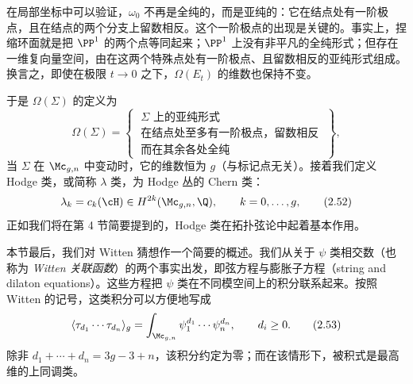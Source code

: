 
在局部坐标中可以验证，$\omega_0$ 不再是全纯的，而是亚纯的：它在结点处有一阶极点，且在结点的两个分支上留数相反。这个一阶极点的出现是关键的。事实上，捏缩环面就是把 $\PP^1$ 的两个点等同起来；$\PP^1$ 上没有非平凡的全纯形式；但存在一维复向量空间，由在这两个特殊点处有一阶极点、且留数相反的亚纯形式组成。换言之，即使在极限 $t\to 0$ 之下，$\Omega(E_t)$ 的维数也保持不变。

于是 $\Omega(\Sigma)$ 的定义为
\begin{equation}
  \Omega(\Sigma)=\left\{\;
  \begin{array}{c}
    \mbox{$\Sigma$ 上的亚纯形式}\\
    \mbox{在结点处至多有一阶极点，留数相反}\\
    \mbox{而在其余各处全纯}
  \end{array}
  \;\right\},
  \tag{2.51}
\end{equation}
当 $\Sigma$ 在 $\Mc_{g,n}$ 中变动时，它的维数恒为 $g$（与标记点无关）。接着我们定义 Hodge 类，或简称 $\lambda$ 类，为 Hodge 丛的 Chern 类：
\begin{equation}
  \lambda_k=c_k(\cH)\in H^{2k}(\Mc_{g,n},\Q),\qquad k=0,\dots,g,
  \tag{2.52}
\end{equation}
正如我们将在第 4 节简要提到的，Hodge 类在拓扑弦论中起着基本作用。

本节最后，我们对 Witten 猜想作一个简要的概述。我们从关于 $\psi$ 类相交数（也称为 \emph{Witten 关联函数}）的两个事实出发，即弦方程与膨胀子方程（string and dilaton equations）。这些方程把 $\psi$ 类在不同模空间上的积分联系起来。按照 Witten 的记号，这类积分可以方便地写成
\begin{equation}
  \langle\tau_{d_1}\cdots\tau_{d_n}\rangle_g=\int_{\Mc_{g,n}}\psi_1^{d_1}\cdots\psi_n^{d_n},\qquad d_i\ge 0.
  \tag{2.53}
\end{equation}
除非 $d_1+\cdots+d_n=3g-3+n$，该积分约定为零；而在该情形下，被积式是最高维的上同调类。

